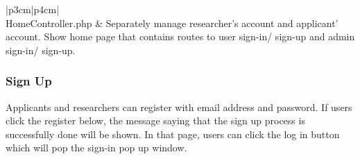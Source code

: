 \documentclass[letterpaper, 10 pt, conference]{ieeeconf}  %
\begin{document}
\begin{supertabular}{ |p{3cm}|p{4cm}| }
 \hline
  \\
 \hline
 HomeController.php & Separately manage researcher's account and applicant' account. Show home page that contains routes to user sign-in/ sign-up and admin sign-in/ sign-up.\\
 \hline
\end{supertabular}

\subsubsection{Sign Up}
Applicants and researchers can register with email address and password. 
If users click the register below, the message saying that the sign up process is successfully done will be shown. In that page, users can click the log in button which will pop the sign-in pop up window.
\end{document}

